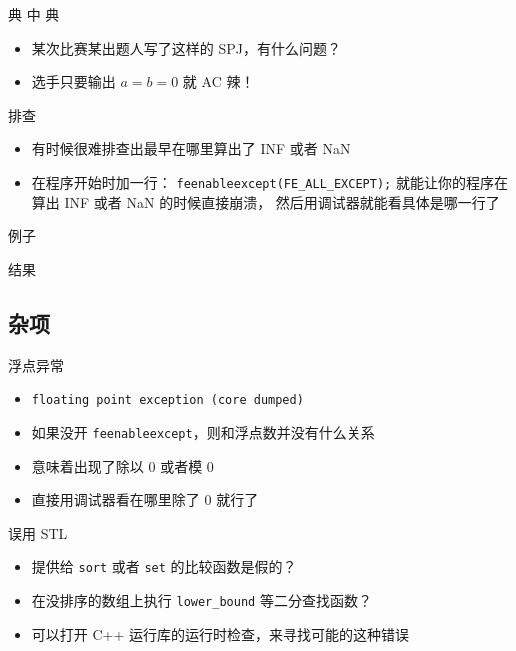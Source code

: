 \documentclass[10pt,mathserif]{beamer}
\newcommand{\lstcode}[1] {  }
\newcommand{\lstterm}[1] {  }
\begin{document}
\begin{frame}{典 中 典}
	\begin{itemize}
		\item 某次比赛某出题人写了这样的 SPJ，有什么问题？
			\lstcode{spj-hacked-by-nan.cc}
			\pause
		\item 选手只要输出 $a = b = 0$ 就 AC 辣！
	\end{itemize}
\end{frame}

\begin{frame}{排查}
	\begin{itemize}
		\item 有时候很难排查出最早在哪里算出了 INF 或者 NaN
		\item 在程序开始时加一行：
			\lstinline{feenableexcept(FE_ALL_EXCEPT);}
			就能让你的程序在算出 INF 或者 NaN 的时候直接崩溃，
			然后用调试器就能看具体是哪一行了
	\end{itemize}
\end{frame}

\begin{frame}{例子}
	\lstcode{feenableexcept.cc}
\end{frame}

\begin{frame}{结果}
	\lstterm{feenableexcept.out}
\end{frame}

\subsection{杂项}
\begin{frame}{浮点异常}
	\begin{itemize}
		\item \lstinline{floating point exception (core dumped)}
		\item 如果没开 \lstinline{feenableexcept}，则和浮点数并没有什么关系
		\item 意味着出现了除以 $0$ 或者模 $0$
		\item 直接用调试器看在哪里除了 $0$ 就行了
	\end{itemize}
\end{frame}

\begin{frame}{误用 STL}
	\begin{itemize}
		\item 提供给 \lstinline|sort| 或者 \lstinline|set|
			的比较函数是假的？
		\item 在没排序的数组上执行 \lstinline|lower_bound| 等二分查找函数？
		\item 可以打开 C++ 运行库的运行时检查，来寻找可能的这种错误
	\end{itemize}
\end{frame}
\end{document}
